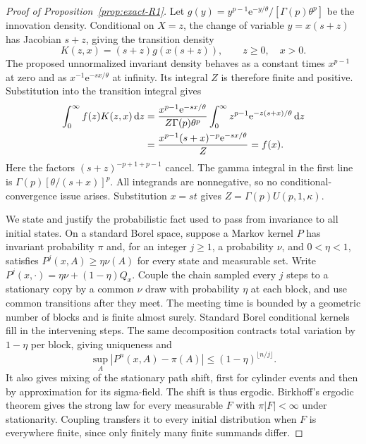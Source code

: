 \begin{proof}[Proof of Proposition~\ref{prop:exact-R1}]
Let $g(y)=y^{p-1}\mathrm{e}^{-y/\theta}/[\Gamma(p)\theta^p]$ be the innovation density. Conditional on $X=z$, the change of variable $y=x(s+z)$ has Jacobian $s+z$, giving the transition density
\begin{equation}
 K(z,x)=(s+z)g(x(s+z)),\qquad z\geq0,\quad x>0.
 \label{eq:exact-transition}
\end{equation}
The proposed unnormalized invariant density behaves as a constant times $x^{p-1}$ at zero and as $x^{-1}\mathrm{e}^{-sx/\theta}$ at infinity. Its integral $Z$ is therefore finite and positive. Substitution into the transition integral gives
\begin{align}
 \int_0^\infty f(z)K(z,x)\,\mathrm{d}z
 &=\frac{x^{p-1}\mathrm{e}^{-sx/\theta}}{Z\Gamma(p)\theta^p}
   \int_0^\infty z^{p-1}\mathrm{e}^{-z(s+x)/\theta}\,\mathrm{d}z\notag\\
 &=\frac{x^{p-1}(s+x)^{-p}\mathrm{e}^{-sx/\theta}}{Z}=f(x).
 \label{eq:exact-invariance}
\end{align}
Here the factors $(s+z)^{-p+1+p-1}$ cancel. The gamma integral in the first line is $\Gamma(p)[\theta/(s+x)]^p$. All integrands are nonnegative, so no conditional-convergence issue arises. Substitution $x=st$ gives $Z=\Gamma(p)U(p,1,\kappa)$.

We state and justify the probabilistic fact used to pass from invariance to all initial states. On a standard Borel space, suppose a Markov kernel $P$ has invariant probability $\pi$ and, for an integer $j\geq1$, a probability $\nu$, and $0<\eta<1$, satisfies $P^j(x,A)\geq\eta\nu(A)$ for every state and measurable set. Write $P^j(x,\cdot)=\eta\nu+(1-\eta)Q_x$. Couple the chain sampled every $j$ steps to a stationary copy by a common $\nu$ draw with probability $\eta$ at each block, and use common transitions after they meet. The meeting time is bounded by a geometric number of blocks and is finite almost surely. Standard Borel conditional kernels fill in the intervening steps. The same decomposition contracts total variation by $1-\eta$ per block, giving uniqueness and
\begin{equation}
 \sup_A|P^n(x,A)-\pi(A)|\leq(1-\eta)^{\lfloor n/j\rfloor}.
 \label{eq:exact-minorization-bound}
\end{equation}
It also gives mixing of the stationary path shift, first for cylinder events and then by approximation for its sigma-field. The shift is thus ergodic. Birkhoff's ergodic theorem gives the strong law for every measurable $F$ with $\pi|F|<\infty$ under stationarity. Coupling transfers it to every initial distribution when $F$ is everywhere finite, since only finitely many finite summands differ.


\end{proof}
